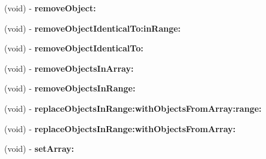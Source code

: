 \begin{DoxyCompactItemize}
\item 
\hypertarget{interfaceget_logistic_units_for_product_response_af73d5b0f91716e0625eb660bb76786a1}{}(void) -\/ {\bfseries remove\+Object\+:}\label{interfaceget_logistic_units_for_product_response_af73d5b0f91716e0625eb660bb76786a1}

\item 
\hypertarget{interfaceget_logistic_units_for_product_response_aa33f8262fdfd911569899a869d008ebe}{}(void) -\/ {\bfseries remove\+Object\+Identical\+To\+:in\+Range\+:}\label{interfaceget_logistic_units_for_product_response_aa33f8262fdfd911569899a869d008ebe}

\item 
\hypertarget{interfaceget_logistic_units_for_product_response_a7741253c0ca64d370583879449d46be8}{}(void) -\/ {\bfseries remove\+Object\+Identical\+To\+:}\label{interfaceget_logistic_units_for_product_response_a7741253c0ca64d370583879449d46be8}

\item 
\hypertarget{interfaceget_logistic_units_for_product_response_a1c572591d7fa11b0b2dfae867f1f996d}{}(void) -\/ {\bfseries remove\+Objects\+In\+Array\+:}\label{interfaceget_logistic_units_for_product_response_a1c572591d7fa11b0b2dfae867f1f996d}

\item 
\hypertarget{interfaceget_logistic_units_for_product_response_a7755317241890e86176973ea4ca66e86}{}(void) -\/ {\bfseries remove\+Objects\+In\+Range\+:}\label{interfaceget_logistic_units_for_product_response_a7755317241890e86176973ea4ca66e86}

\item 
\hypertarget{interfaceget_logistic_units_for_product_response_a66a6b9ef110f5dd4ab785fbc7e0a8711}{}(void) -\/ {\bfseries replace\+Objects\+In\+Range\+:with\+Objects\+From\+Array\+:range\+:}\label{interfaceget_logistic_units_for_product_response_a66a6b9ef110f5dd4ab785fbc7e0a8711}

\item 
\hypertarget{interfaceget_logistic_units_for_product_response_af24ab5a4b2b1e866cec4c7f624df3712}{}(void) -\/ {\bfseries replace\+Objects\+In\+Range\+:with\+Objects\+From\+Array\+:}\label{interfaceget_logistic_units_for_product_response_af24ab5a4b2b1e866cec4c7f624df3712}

\item 
\hypertarget{interfaceget_logistic_units_for_product_response_aabbe2a148cd2343bf8717cf5c7a86d4e}{}(void) -\/ {\bfseries set\+Array\+:}\label{interfaceget_logistic_units_for_product_response_aabbe2a148cd2343bf8717cf5c7a86d4e}


\end{DoxyCompactItemize}

